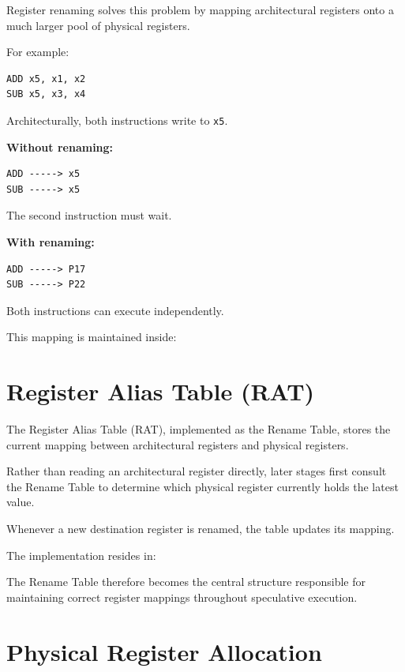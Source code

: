 Register renaming solves this problem by mapping architectural registers onto a much larger
pool of physical registers.

For example:
\begin{verbatim}
ADD x5, x1, x2
SUB x5, x3, x4
\end{verbatim}

Architecturally, both instructions write to \texttt{x5}.

\textbf{Without renaming:}
\begin{verbatim}
ADD -----> x5
SUB -----> x5
\end{verbatim}
The second instruction must wait.

\textbf{With renaming:}
\begin{verbatim}
ADD -----> P17
SUB -----> P22
\end{verbatim}
Both instructions can execute independently.

This mapping is maintained inside:

\begin{center}
\end{center}

\section{Register Alias Table (RAT)}

The Register Alias Table (RAT), implemented as the Rename Table, stores the current mapping
between architectural registers and physical registers.

Rather than reading an architectural register directly, later stages first consult the Rename Table
to determine which physical register currently holds the latest value.

Whenever a new destination register is renamed, the table updates its mapping.

The implementation resides in:

\begin{center}
\end{center}

The Rename Table therefore becomes the central structure responsible for maintaining correct
register mappings throughout speculative execution.

\section{Physical Register Allocation}

